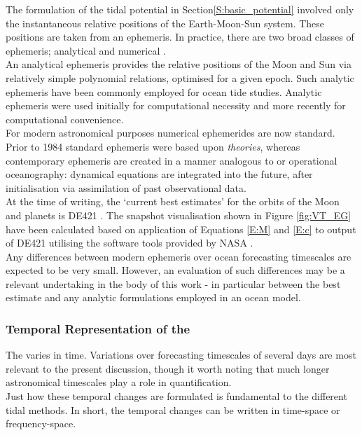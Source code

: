 The formulation of the tidal potential in Section\ref{S:basic_potential} involved only the instantaneous relative positions of the Earth-Moon-Sun system.   These positions are taken from an ephemeris.  In practice, there are two broad classes of ephemeris; analytical and numerical \citep{Wenzel:1997kn}.\\
An analytical ephemeris provides the relative positions of the Moon and Sun via relatively simple polynomial relations, optimised for a given epoch.  Such analytic ephemeris have been commonly employed for ocean tide studies.   Analytic ephemeris were used initially for computational necessity and more recently for computational convenience.\\
For modern astronomical purposes numerical ephemerides are now standard.  Prior to 1984 standard ephemeris were based upon \emph{theories}\cite[sec 8.1]{Urban:2013vl}, whereas contemporary ephemeris are created in a manner analogous to \NWP{} or operational oceanography: dynamical equations are integrated into the future, after initialisation via assimilation of past observational data.\\
At the time of writing, the `current best estimates' for the orbits of the Moon and planets is DE421 \citep{Folkner:2008wm}.   The snapshot visualisation shown in Figure \ref{fig:VT_EG} have been calculated based on application of Equations \ref{E:M} and \ref{E:c} to output of DE421 utilising the software tools provided by NASA \cite[p]{Anonymous:vo}.\\
Any differences between modern ephemeris over ocean forecasting timescales are expected to be very small.   However, an evaluation of such differences may be a relevant undertaking in the body of this work - in particular between the best estimate and any analytic formulations employed in an ocean model.



\subsubsection{Temporal Representation of the \ATGP{}}
The \ATGP{} varies in time.  Variations over forecasting timescales of several days are most relevant to the present discussion, though it worth noting that much longer astronomical timescales play a role in quantification.\\
Just how these temporal changes are formulated is fundamental to the different tidal methods.   In short, the temporal changes can be written in time-space or frequency-space.\\



